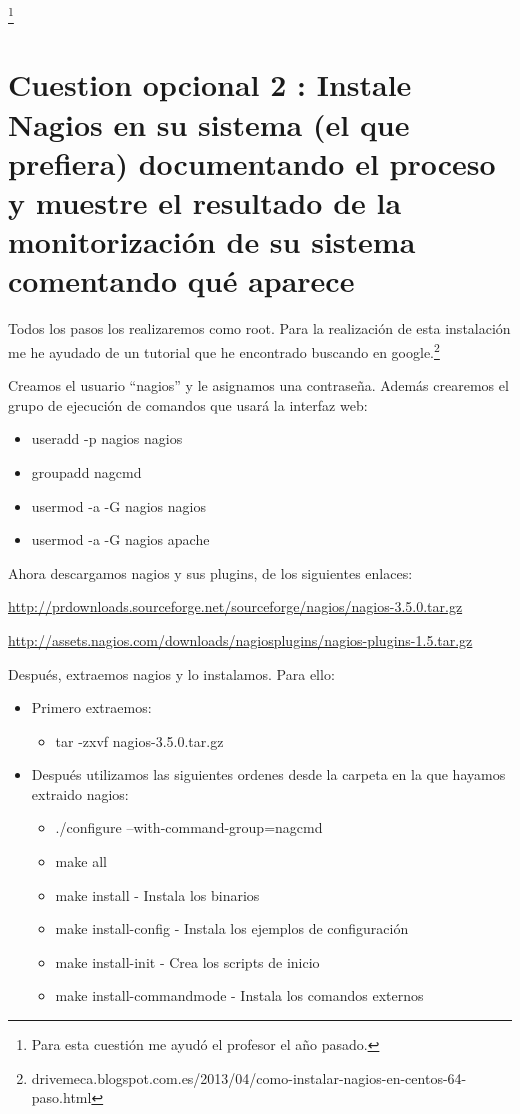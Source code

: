 \footnote{Para esta cuestión me ayudó el profesor el año pasado.}


\section*{Cuestion opcional 2 : Instale Nagios en su sistema (el que prefiera) documentando el proceso y muestre el resultado de la monitorización de su sistema comentando qué aparece}

Todos los pasos los realizaremos como root. Para la realización de esta instalación me he ayudado de un tutorial que he encontrado buscando en google.\footnote{drivemeca.blogspot.com.es/2013/04/como-instalar-nagios-en-centos-64-
paso.html}

Creamos el usuario “nagios” y le asignamos una contraseña. Además crearemos el
grupo de ejecución de comandos que usará la interfaz web:

\begin{itemize}
\item useradd -p nagios nagios
\item groupadd nagcmd
\item usermod -a -G nagios nagios
\item usermod -a -G nagios apache
\end{itemize}

Ahora descargamos nagios y sus plugins, de los siguientes enlaces:

\url{http://prdownloads.sourceforge.net/sourceforge/nagios/nagios-3.5.0.tar.gz}

\url{http://assets.nagios.com/downloads/nagiosplugins/nagios-plugins-1.5.tar.gz}

Después, extraemos nagios y lo instalamos. Para ello:

\begin{itemize}
	\item Primero extraemos:
		\begin{itemize}
			\item tar -zxvf nagios-3.5.0.tar.gz	
		\end{itemize}	 
	\item Después utilizamos las siguientes ordenes desde la carpeta en la que
hayamos extraido nagios:
	 	\begin{itemize}
	 		\item ./configure --with-command-group=nagcmd
	 		\item make all
	 		\item make install - Instala los binarios
	 		\item make install-config - Instala los ejemplos de configuración
	 		\item make install-init  - Crea los scripts de inicio
	 		\item make install-commandmode - Instala los comandos externos
	 	\end{itemize}	
\end{itemize}

